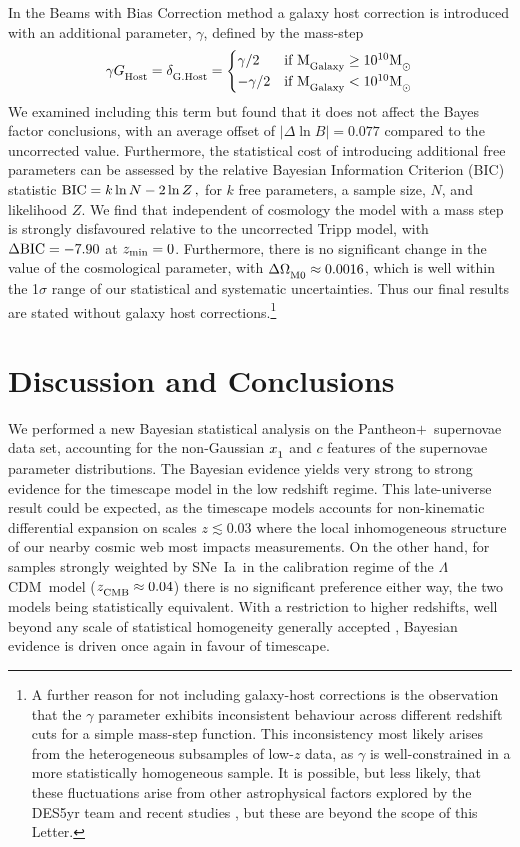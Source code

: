 \documentclass[fleqn,usenatbib,onecolumn,referee]{mnras}
\newcommand{\pplus}{Pantheon$+$}
\newcommand{\LA}{\Lambda}
\newcommand{\LCDM}{$\LA$CDM}
\newcommand{\sne}{SNe~Ia}
\newcommand{\Z}[1]{_{\lower2pt\hbox{$\scriptstyle#1$}}}
\newcommand{\Ns}[1]{_{\lower2pt\hbox{$\scriptstyle\rm#1$}}}
\newcommand{\lsim}{\lesssim}
\newcommand{\ns}[1]{_{\rm #1}}
\newcommand{\zmin}{z\ns{min}}
\begin{document}
In the Beams with Bias Correction method \citep{Kessler_2017} a galaxy host correction is introduced with an additional parameter, $\gamma$, defined by the mass-step
\begin{equation}
\gamma G\Ns{Host} = \delta\Ns{G. Host} = 
    \begin{cases}
        \gamma/2 & \text{if } {\rm M}\Ns{Galaxy} \geq 10^{10} {\rm M}\Z{\odot}\\
        -\gamma/2 & \text{if } {\rm M}\Ns{Galaxy} < 10^{10} {\rm M}\Z{\odot}
    \end{cases}
\end{equation}
We examined including this term but found that it does not affect the Bayes factor conclusions, with an average
offset of $| \Delta \ln B | = 0.077$ compared to the uncorrected value. Furthermore, the statistical cost of introducing additional free parameters can be assessed by the relative Bayesian Information Criterion (BIC) statistic \citep{Schwarz_1978, Kass_1995} ${\rm BIC} = k\ln N - 2 \ln Z\,, $ for $k$ free parameters, a sample size, $N$, and likelihood $Z$. We find that independent of cosmology the model with a mass step is strongly disfavoured relative to the uncorrected Tripp model, with $\Delta {\rm BIC} = -7.90$ at $\zmin = 0$. Furthermore, there is no significant change in the value of the cosmological parameter, with $\Delta \Omega\Ns{M0} \approx 0.0016$, which is well within the 1$\sigma$ range of our statistical and systematic uncertainties. Thus our final results are stated without galaxy host corrections.\footnote{A further reason for not including galaxy-host corrections is the observation that the $\gamma$ parameter exhibits inconsistent behaviour across different redshift cuts for a simple mass-step function. This inconsistency most likely arises from the heterogeneous subsamples of low-$z$ data, as $\gamma$ is well-constrained in a more statistically homogeneous sample. It is possible, but less likely, that these fluctuations arise from other astrophysical factors explored by the DES5yr team and recent studies \citep{Dixon_2024}, but these are beyond the scope of this Letter.}

\section{Discussion and Conclusions}
We performed a new Bayesian statistical analysis on the \pplus\ supernovae data set, accounting for the non-Gaussian $x\Z 1$ and $c$ features of the supernovae parameter distributions. The Bayesian evidence yields very strong to strong evidence for the timescape model in the low redshift regime. This late-universe result could be expected, as the timescape models accounts for non-kinematic differential expansion on scales $z\lsim0.03$ where the local inhomogeneous structure of our nearby cosmic web most impacts measurements.
On the other hand, for samples strongly weighted by \sne\ in the calibration regime of the \LCDM\ model ($z\Ns{CMB}\approx0.04$) there is no significant preference either way, the two models being statistically equivalent. With a restriction to higher redshifts, well beyond any scale of statistical homogeneity generally accepted \citep{Lane_2023}, Bayesian evidence is driven once again in favour of timescape.
\end{document}
